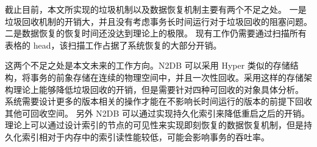 截止目前，本文所实现的垃圾机制以及数据恢复机制主要有两个不足之处。
一是垃圾回收机制的开销大，并且没有考虑事务长时间运行对于垃圾回收的阻塞问题。
二是数据恢复的恢复时间还没达到理论上的极限。
现有工作仍需要通过扫描所有表格的 head，该扫描工作占据了系统恢复的大部分开销。

这两个不足之处是本文未来的工作方向。N2DB 可以采用 Hyper 类似的存储结构，将事务的前象存储在连续的物理空间中，并且一次性回收。采用这样的存储架构理论上能够降低垃圾回收的开销，但是需要针对四种可回收的对象具体分析。
系统需要设计更多的版本相关的操作才能在不影响长时间运行的版本的前提下回收其他可回收空间。
另外 N2DB 可以通过实现持久化索引来降低重启之后的开销。理论上可以通过设计索引的节点的可见性来实现即刻恢复的数据恢复机制，但是持久化索引相对于内存中的索引读性能较低，可能会影响事务的吞吐率。
